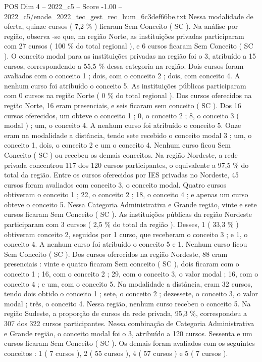 \begin{textsample}{POS Dim 4 – 2022\_c5 – Score -1.00 – 2022\_c5/enade\_2022\_tec\_gest\_rec\_hum\_6c3def66be.txt}
Nessa modalidade de oferta, quinze cursos ( 7,2 \% ) ficaram Sem Conceito ( SC ).
Na análise por região, observa -se que, na região Norte, as instituições privadas participaram com 27 cursos ( 100 \% do total regional ), e 6 cursos ficaram Sem Conceito ( SC ).
O conceito modal para as instituições privadas na região foi o 3, atribuído a 15 cursos, correspondendo a 55,5 \% dessa categoria na região.
Dois cursos foram avaliados com o conceito 1 ; dois, com o conceito 2 ; dois, com conceito 4.
A nenhum curso foi atribuído o conceito 5.
As instituições públicas participaram com 0 cursos na região Norte ( 0 \% do total regional ).
Dos cursos oferecidos na região Norte, 16 eram presenciais, e seis ficaram sem conceito ( SC ).
Dos 16 cursos oferecidos, um obteve o conceito 1 ; 0, o conceito 2 ; 8, o conceito 3 ( modal ) ; um, o conceito 4.
A nenhum curso foi atribuído o conceito 5.
Onze eram na modalidade a distância, tendo sete recebido o conceito modal 3 ; um, o conceito 1, dois, o conceito 2 e um o conceito 4.
Nenhum curso ficou Sem Conceito ( SC ) ou recebeu os demais conceitos.
Na região Nordeste, a rede privada concentrou 117 dos 120 cursos participantes, o equivalente a 97,5 \% do total da região.
Entre os cursos oferecidos por IES privadas no Nordeste, 45 cursos foram avaliados com conceito 3, o conceito modal.
Quatro cursos obtiveram o conceito 1 ; 22, o conceito 2 ; 18, o conceito 4 ; e apenas um curso obteve o conceito 5.
Nessa Categoria Administrativa e Grande região, vinte e sete cursos ficaram Sem Conceito ( SC ).
As instituições públicas da região Nordeste participaram com 3 cursos ( 2,5 \% do total da região ).
Desses, 1 ( 33,3 \% ) obtiveram conceito 2, seguidos por 1 curso, que receberam o conceito 3 ; e 1, o conceito 4.
A nenhum curso foi atribuído o conceito 5 e 1.
Nenhum curso ficou Sem Conceito ( SC ).
Dos cursos oferecidos na região Nordeste, 88 eram presenciais : vinte e quatro ficaram Sem conceito ( SC ), dois ficaram com o conceito 1 ; 16, com o conceito 2 ; 29, com o conceito 3, o valor modal ; 16, com o conceito 4 ; e um, com o conceito 5.
Na modalidade a distância, eram 32 cursos, tendo dois obtido o conceito 1 ; sete, o conceito 2 ; dezessete, o conceito 3, o valor modal ; três, o conceito 4.
Nessa região, nenhum curso recebeu o conceito 5.
Na região Sudeste, a proporção de cursos da rede privada, 95,3 \%, correspondeu a 307 dos 322 cursos participantes.
Nessa combinação de Categoria Administrativa e Grande região, o conceito modal foi o 3, atribuído a 120 cursos.
Sessenta e um cursos ficaram Sem Conceito ( SC ).
Os demais foram avaliados com os seguintes conceitos : 1 ( 7 cursos ), 2 ( 55 cursos ), 4 ( 57 cursos ) e 5 ( 7 cursos ).

\end{textsample}
